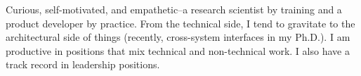 Curious, self-motivated, and empathetic--a research scientist by training and a product developer by practice. From the technical side, I tend to gravitate to the architectural side of things (recently, cross-system interfaces in my Ph.D.). I am productive in positions that mix technical and non-technical work. I also have a track record in leadership positions.



%
%
%
%
%
%
%

